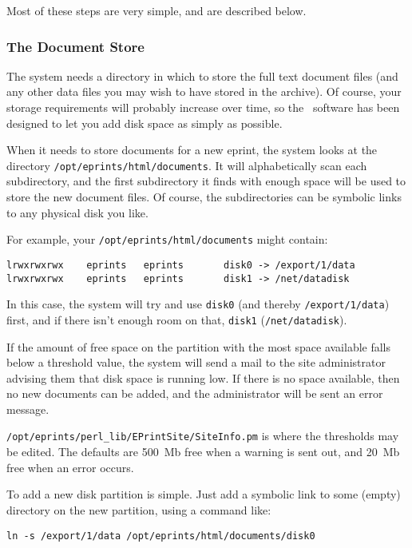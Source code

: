 Most of these steps are very simple, and are described below.


\subsubsection{The Document Store}

The system needs a directory in which to store the full text document files (and any other data files you may wish to have stored in the archive). Of course, your storage requirements will probably increase over time, so the \eprints\ software has been designed to let you add disk space as simply as possible.

When it needs to store documents for a new eprint, the system looks at the directory {\tt /opt/eprints/html/documents}. It will alphabetically scan each subdirectory, and the first subdirectory it finds with enough space will be used to store the new document files. Of course, the subdirectories can be symbolic links to any physical disk you like.

For example, your {\tt /opt/eprints/html/documents} might contain:

\begin{verbatim}
lrwxrwxrwx    eprints   eprints       disk0 -> /export/1/data
lrwxrwxrwx    eprints   eprints       disk1 -> /net/datadisk
\end{verbatim}

In this case, the system will try and use {\tt disk0} (and thereby {\tt /export/1/data}) first, and if there isn't enough room on that, {\tt disk1} ({\tt /net/datadisk}).

If the amount of free space on the partition with the most space available falls below a threshold value, the system will send a mail to the site administrator advising them that disk space is running low. If there is no space available, then no new documents can be added, and the administrator will be sent an error message.

{\tt /opt/eprints/perl\_lib/EPrintSite/SiteInfo.pm} is where the thresholds may be edited. The defaults are 500~Mb free when a warning is sent out, and 20~Mb free when an error occurs.

To add a new disk partition is simple. Just add a symbolic link to some (empty) directory on the new partition, using a command like:

\begin{verbatim}
ln -s /export/1/data /opt/eprints/html/documents/disk0
\end{verbatim}

